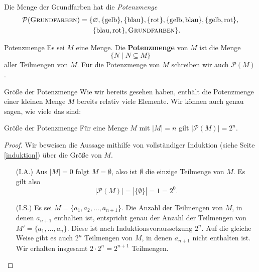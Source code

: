 \documentclass[../../main.tex]{subfiles}
\begin{document}
\begin{example}{}
    Die Menge der Grundfarben hat die \emph{Potenzmenge}
    \begin{align*}
        \mathcal{P}(\textsc{Grundfarben})=\{&\emptyset,\{\text{gelb}\},\{\text{blau}\},\{\text{rot}\},\{\text{gelb},\text{blau}\},\{\text{gelb},\text{rot}\},\\
        &\{\text{blau},\text{rot}\},\textsc{Grundfarben}\}.
    \end{align*}
\end{example}

\begin{definition}{Potenzmenge}
    Es sei $M$ eine Menge. Die \textbf{Potenzmenge} von $M$ ist die Menge 
    \[\{N\mid N\subseteq M\}\]
    aller Teilmengen von $M$. Für die Potenzmenge von $M$ schreiben wir auch $\mathcal{P}(M)$.
\end{definition}

\begin{advanced}{Größe der Potenzmenge}
    Wie wir bereits gesehen haben, enthält die Potenzmenge einer kleinen Menge $M$ bereits relativ viele Elemente. Wir können auch genau sagen, wie viele das sind:
    \begin{theorem}{Größe der Potenzmenge}
        Für eine Menge $M$ mit $|M|=n$ gilt $|\mathcal{P}(M)|=2^n$.
    \end{theorem}
    \begin{proof}
        Wir beweisen die Aussage mithilfe von vollständiger Induktion (siehe Seite \ref{induktion}) über die Größe von $M$.
        \begin{enumerate}
            \item[(I.A.)] Aus $|M|=0$ folgt $M=\emptyset$, also ist $\emptyset$ die einzige Teilmenge von $M$. Es gilt also
                \[|\mathcal{P}(M)|=|\{\emptyset\}|=1=2^0.\]
            \item[(I.S.)] Es sei $M=\{a_1,a_2,\dots,a_{n+1}\}$. Die Anzahl der Teilmengen von $M$, in denen $a_{n+1}$ enthalten ist, entspricht genau der Anzahl der Teilmengen von $M'=\{a_1,\dots,a_n\}$. Diese ist nach Induktionsvoraussetzung $2^n$. Auf die gleiche Weise gibt es auch $2^n$ Teilmengen von $M$, in denen $a_{n+1}$ nicht enthalten ist. Wir erhalten insgesamt $2\cdot 2^n=2^{n+1}$ Teilmengen.
        \end{enumerate}
    \end{proof}
\end{advanced}
\end{document}
